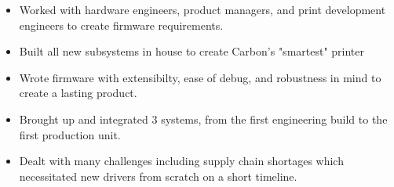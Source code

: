 \documentclass[10pt,a4paper,ragged2e,withhyper]{altacv}
\begin{document}
\begin{paracol}{2}

\divider







\switchcolumn



\divider


\divider


\begin{itemize}
\item Worked with hardware engineers, product managers, and print development engineers to create firmware requirements.
\item Built all new subsystems in house to create Carbon's "smartest" printer
\item Wrote firmware with extensibilty, ease of debug, and robustness in mind to create a lasting product.
\item Brought up and integrated 3 systems, from the first engineering build to the first production unit.
\item Dealt with many challenges including supply chain shortages which necessitated new drivers from scratch on a short timeline.
\end{itemize}

\divider


\end{paracol}
\end{document}
